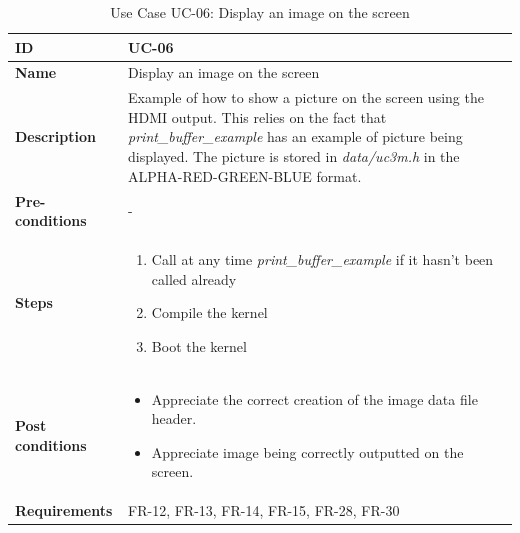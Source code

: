 \begin{table}[H]
    \centering
    \begin{tabular}{| p{3cm} | p{7cm} |}
    \hline
    \textbf{ID}             & UC-06 \\ \hline
    \textbf{Name}           & Display an image on the screen\\ \hline
    \textbf{Description}    & Example of how to show a picture on the screen using the HDMI output. This relies on the fact that \textit{print\_buffer\_example} has an example of picture being displayed.
    						   The picture is stored in \textit{data/uc3m.h} in the ALPHA-RED-GREEN-BLUE format.
	\\ \hline
    \textbf{Pre-conditions} & - \\ \hline
    \textbf{Steps}          &   \begin{enumerate}
                                    \item Call at any time \textit{print\_buffer\_example} if it hasn't been called already
                                    \item Compile the kernel
                                    \item Boot the kernel
                                \end{enumerate}
 \\ \hline
    \textbf{Post conditions} & 	\begin{itemize}
    									\item Appreciate the correct creation of the image data file header.
    									\item Appreciate image being correctly outputted on the screen.
    							   	\end{itemize}
    							   	\\ \hline
    \textbf{Requirements}       &  FR-12, FR-13, FR-14, FR-15, FR-28, FR-30 \\ \hline
    \end{tabular}
    \caption{Use Case UC-06: Display an image on the screen}
\end{table}



